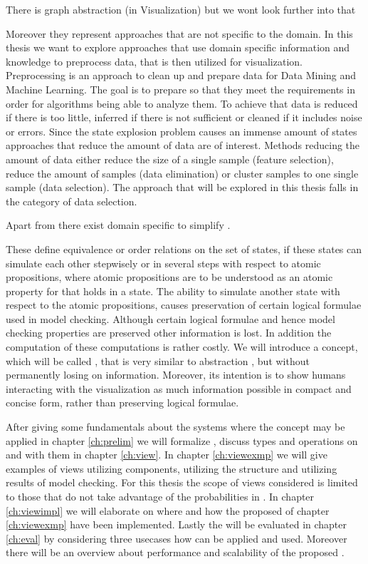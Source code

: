 \documentclass[preview]{standalone}
\begin{document}
There is graph abstraction (in Visualization) but we wont look further into that 

Moreover they represent approaches that are not specific to the domain. In this thesis we want to explore approaches that use domain specific information and knowledge to preprocess data, that is then utilized for visualization. Preprocessing is an approach to clean up and prepare data for Data Mining and Machine Learning. The goal is to prepare so that they meet the requirements in order for algorithms being able to analyze them. To achieve that data is reduced if there is too little, inferred if there is not sufficient or cleaned if it includes noise or errors. Since the state explosion problem causes an immense amount of states approaches that reduce the amount of data are of interest. Methods reducing the amount of data either reduce the size of a single sample (feature selection), reduce the amount of samples (data elimination) or cluster samples to one single sample (data selection)\cite{Famili1997,Garcia2016}. The approach that will be explored in this thesis falls in the category of data selection. 

Apart from  there exist domain specific to simplify \mdpsN. 


These define equivalence or order relations on the set of states, if these states can simulate each other stepwisely or in several steps with respect to atomic propositions, where atomic propositions are to be understood as an atomic property for that holds in a state. The ability to simulate another state with respect to the atomic propositions, causes preservation of certain logical formulae used in model checking. Although certain logical formulae and hence model checking properties are preserved other information is lost. In addition the computation of these computations is rather costly. We will introduce a concept, which will be called \viewN, that is very similar to abstraction \cite[pp. 499]{Baier2008}, but without permanently losing on information. Moreover, its intention is to show humans interacting with the visualization as much information possible in compact and concise form, rather than preserving logical formulae.

After giving some fundamentals about the systems where the concept \viewN may be applied in chapter \ref{ch:prelim} we will formalize \viewsN, discuss types and operations on and with them in chapter \ref{ch:view}. In chapter \ref{ch:viewexmp} we will give examples of views utilizing \chgphN components, \viewsN utilizing the \chgphN structure and \viewsN utilizing results of model checking. For this thesis the scope of views considered is limited to those that do not take advantage of the probabilities in \chgphsN. In chapter \ref{ch:viewimpl} we will elaborate on where and how the proposed \viewsN of chapter \ref{ch:viewexmp} have been implemented. Lastly the \viewsN will be evaluated in chapter \ref{ch:eval} by considering three usecases how \viewsN can be applied and used. Moreover there will be an overview about performance and scalability of the proposed \viewsN. 
\end{document}
